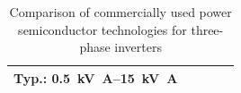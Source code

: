 \begin{frame}
\begin{table}
\begin{tabular}{p{2.2cm} p{3cm} p{3cm} p{2.2cm} p{3.5cm}}
            Typ.: \SIrange{0.5}{15}{\kilo\volt\ampere}                                                                                                                                                                                                                                                                                                                            \\
            \bottomrule
        \end{tabular}
        \caption{Comparison of commercially used power semiconductor technologies for three-phase inverters}
    \end{table}
\end{frame}

